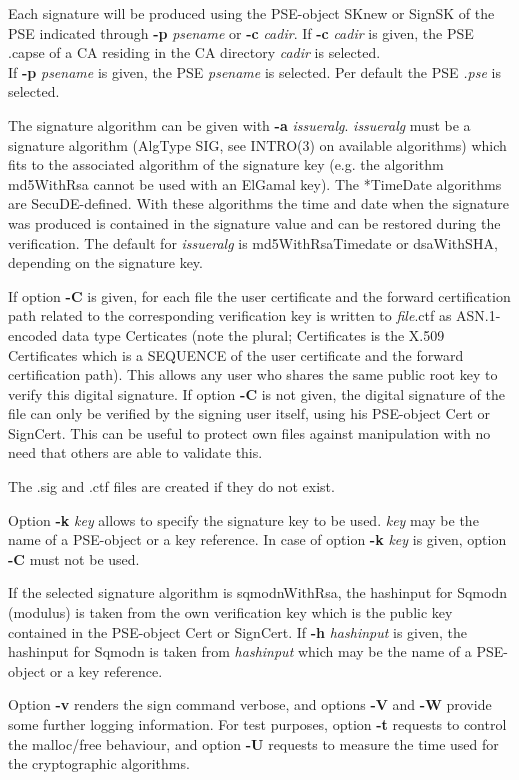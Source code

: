 Each signature will be produced using the PSE-object SKnew or SignSK
of the PSE indicated through {\bf -p} {\em psename} or {\bf -c} {\em cadir}.
If {\bf -c} {\em cadir} is given, the PSE .capse of a CA residing in the CA directory {\em cadir}
is selected. \\
If {\bf -p} {\em psename} is given, the PSE {\em psename} is selected. Per default the PSE {\em .pse} is 
selected.

The signature algorithm can be given with {\bf -a} {\em issueralg}. 
{\em issueralg} must be a
signature algorithm (AlgType SIG, see INTRO(3) on available algorithms) which fits to the associated 
algorithm
of the signature key (e.g. the algorithm md5WithRsa cannot be used with an ElGamal key). The *TimeDate 
algorithms
are SecuDE-defined. With these algorithms the time and date when the signature was produced is 
contained
in the signature value and can be restored during the verification.
The default for {\em issueralg} is md5WithRsaTimedate or dsaWithSHA, depending on the signature key. 

If option {\bf -C} is given, for each file the user certificate and the forward certification path related to
the corresponding verification key is written to {\em file}.ctf as ASN.1-encoded data type Certicates 
(note the plural; Certificates is the X.509 Certificates which is a SEQUENCE of the user certificate and
the forward certification path). This allows any user who shares the same public root key to verify
this digital signature. If option {\bf -C} is not given, the digital signature of the file can only be
verified by the signing user itself, using his PSE-object Cert or SignCert. This can be useful to
protect own files against manipulation with no need that others are able to validate this.

The .sig and .ctf files are created if they do not exist.
 
Option {\bf -k} {\em key} allows to specify the signature key to be used. {\em key} may
be the name of a PSE-object or a key reference. In case of option {\bf -k} {\em key} is given,
option {\bf -C} must not be used.

If the selected signature algorithm is sqmodnWithRsa, the hashinput for Sqmodn (modulus) is taken 
from the own verification key which is the public key contained in the PSE-object Cert or SignCert.
If {\bf -h} {\em hashinput} is given, the hashinput for Sqmodn is taken from {\em hashinput}
which may be the name of a PSE-object or a key reference.

Option {\bf -v} renders the sign command verbose, and options {\bf -V} and {\bf -W} provide some further
logging information. For test purposes, option {\bf -t} requests
to control the malloc/free behaviour, and option {\bf -U} requests to measure the time used for the 
cryptographic
algorithms.
\\ [1em]


